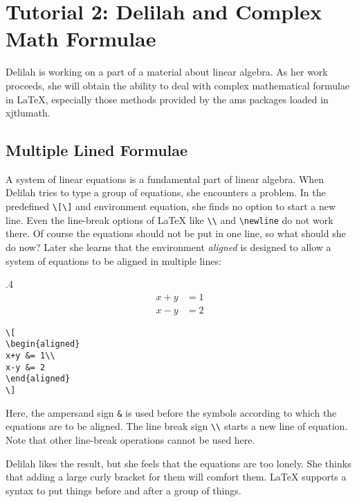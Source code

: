 \section{Tutorial 2: Delilah and Complex Math Formulae}
Delilah is working on a part of a material about linear algebra. As her work proceeds, she will obtain the ability to deal with complex mathematical formulae in \LaTeX{}, especially those methods provided by the ams packages loaded in xjtlumath.

\subsection{Multiple Lined Formulae}
A system of linear equations is a fundamental part of linear algebra. When Delilah tries to type a group of equations, she encounters a problem. In the predefined \verb=\[\]= and environment equation, she finds no option to start a new line. Even the line-break options of \LaTeX{} like \verb=\\= and \verb=\newline= do not work there. Of course the equations should not be put in one line, so what should she do now? Later she learns that the environment \emph{aligned} is designed to allow a system of equations to be aligned in multiple lines:

\begin{miniexammar}{.4\textandmarginlen}{
\[
\begin{aligned}
x+y &= 1\\
x-y &= 2
\end{aligned}
\]
}
\begin{lstlisting}
\[
\begin{aligned}
x+y &= 1\\
x-y &= 2
\end{aligned}
\]
\end{lstlisting}
\end{miniexammar}
Here, the ampersand sign \verb=&= is used before the symbols according to which the equations are to be aligned. The line break sign \verb=\\= starts a new line of equation. Note that other line-break operations cannot be used here.

Delilah likes the result, but she feels that the equations are too lonely. She thinks that adding a large curly bracket for them will comfort them. \LaTeX{} supports a syntax to put things before and after a group of things.

